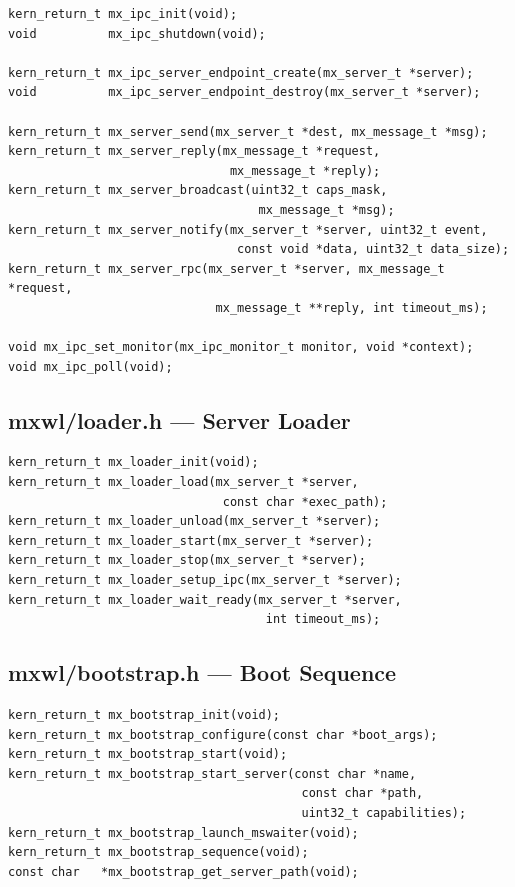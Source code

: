 \documentclass[a4paper,11pt]{article}
\begin{document}
\begin{lstlisting}
kern_return_t mx_ipc_init(void);
void          mx_ipc_shutdown(void);

kern_return_t mx_ipc_server_endpoint_create(mx_server_t *server);
void          mx_ipc_server_endpoint_destroy(mx_server_t *server);

kern_return_t mx_server_send(mx_server_t *dest, mx_message_t *msg);
kern_return_t mx_server_reply(mx_message_t *request,
                               mx_message_t *reply);
kern_return_t mx_server_broadcast(uint32_t caps_mask,
                                   mx_message_t *msg);
kern_return_t mx_server_notify(mx_server_t *server, uint32_t event,
                                const void *data, uint32_t data_size);
kern_return_t mx_server_rpc(mx_server_t *server, mx_message_t *request,
                             mx_message_t **reply, int timeout_ms);

void mx_ipc_set_monitor(mx_ipc_monitor_t monitor, void *context);
void mx_ipc_poll(void);
\end{lstlisting}

\subsection{mxwl/loader.h --- Server Loader}

\begin{lstlisting}
kern_return_t mx_loader_init(void);
kern_return_t mx_loader_load(mx_server_t *server,
                              const char *exec_path);
kern_return_t mx_loader_unload(mx_server_t *server);
kern_return_t mx_loader_start(mx_server_t *server);
kern_return_t mx_loader_stop(mx_server_t *server);
kern_return_t mx_loader_setup_ipc(mx_server_t *server);
kern_return_t mx_loader_wait_ready(mx_server_t *server,
                                    int timeout_ms);
\end{lstlisting}

\subsection{mxwl/bootstrap.h --- Boot Sequence}

\begin{lstlisting}
kern_return_t mx_bootstrap_init(void);
kern_return_t mx_bootstrap_configure(const char *boot_args);
kern_return_t mx_bootstrap_start(void);
kern_return_t mx_bootstrap_start_server(const char *name,
                                         const char *path,
                                         uint32_t capabilities);
kern_return_t mx_bootstrap_launch_mswaiter(void);
kern_return_t mx_bootstrap_sequence(void);
const char   *mx_bootstrap_get_server_path(void);
\end{lstlisting}
\end{document}
